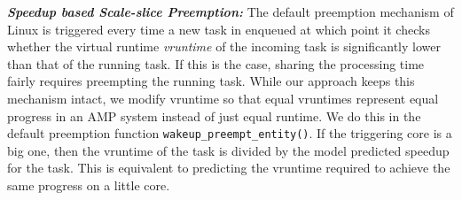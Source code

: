 
\textbf{\textit {Speedup based Scale-slice Preemption:}} The default preemption mechanism of Linux is triggered every time a new task in enqueued at which point it checks whether the virtual runtime {\it vruntime} of the incoming task is significantly lower than that of the running task. If this is the case, sharing the processing time fairly requires preempting the running task. While our approach keeps this mechanism intact, we modify vruntime so that equal vruntimes represent equal progress in an AMP system instead of just equal runtime. We do this in the default preemption function \texttt{wakeup\_preempt\_entity()}. If the triggering core is a big one, then the vruntime of the task is divided by the model predicted speedup for the task. This is equivalent to predicting the vruntime required to achieve the same progress on a little core.


